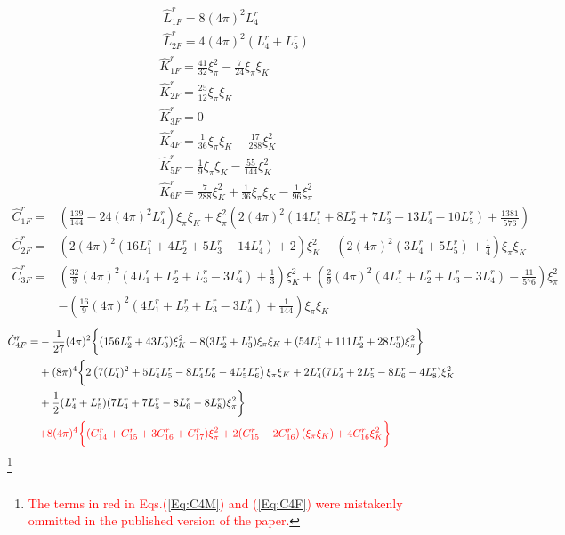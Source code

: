 \documentclass[12pt,a4paper]{article}
\begin{document}
\begin{align}
	& \hat{L}^r_{1F} = 8 (4 \pi )^2 L^r_{4} \nonumber \\
	& \hat{L}^r_{2F} = 4 (4 \pi )^2 (L^r_{4}+L^r_{5})
\end{align}
\begin{align}
	& \hat{K}^r_{1F} = \frac{41}{32} \xi _{\pi }^2 - \frac{7}{24} \xi_{\pi } \xi_K \nonumber \\
	& \hat{K}^r_{2F} = \frac{25}{12} \xi_{\pi} \xi_K \nonumber \\
	& \hat{K}^r_{3F} = 0 \nonumber \\
	& \hat{K}^r_{4F} = \frac{1}{36} \xi_{\pi} \xi_K - \frac{17}{288} \xi _K^2 \nonumber \\
	& \hat{K}^r_{5F} = \frac{1}{9} \xi_{\pi } \xi_K - \frac{55}{144} \xi _K^2 \nonumber \\
	& \hat{K}^r_{6F} = \frac{7}{288} \xi_K^2 + \frac{1}{36}\xi_{\pi} \xi_K - \frac{1}{96} \xi_{\pi }^2
\end{align}
\begin{align*}
	\hat{C}^r_{1F} =& \left(\frac{139}{144}-24 (4 \pi )^2 L^r_{4}\right) \xi _{\pi } \xi _K+\xi _{\pi }^2 \left(2 (4 \pi )^2 (14 L^r_{1}+8 L^r_{2}+7 L^r_{3}-13 L^r_{4}-10 L^r_{5})+\frac{1381}{576}\right)
\end{align*}
\begin{align*}
	\hat{C}^r_{2F} =& \left(2 (4 \pi )^2 (16 L^r_{1}+4 L^r_{2}+5 L^r_{3}-14 L^r_{4})+2\right) \xi_K^2 - \left(2 (4 \pi )^2 (3 L^r_{4}+5 L^r_{5})+\frac{1}{4}\right) \xi_{\pi} \xi_K 
\end{align*}
\begin{align*}
	\hat{C}^r_{3F} =& \left(\frac{32}{9} (4\pi)^2 (4 L^r_{1}+L^r_{2}+L^r_{3}-3 L^r_{4})+\frac{1}{3}\right) \xi_K^2 + \left(\frac{2}{9} (4\pi)^2 (4 L^r_{1}+L^r_{2}+L^r_{3}-3 L^r_{4})-\frac{11}{576} \right) \xi_{\pi}^2 \nonumber \\
	& - \left(\frac{16}{9} (4\pi)^2 (4 L^r_{1}+L^r_{2}+L^r_{3}-3 L^r_{4})+\frac{1}{144}\right) \xi_{\pi} \xi_K
\end{align*}
\begin{align} 
	\hat{C}^r_{4F} =& -\frac{1}{27} (4\pi)^2 \bigg\{ (156 L^r_{2}+43 L^r_{3}) \xi_K^2 -8 (3 L^r_{2}+L^r_{3}) \xi _{\pi } \xi _K + (54 L^r_{1}+111 L^r_{2}+28 L^r_{3}) \xi_{\pi}^2 \bigg\}  \nonumber \\
	& + (8 \pi )^4 \bigg\{ 2 \left(7 (L^r_{4})^2 + 5 L^r_{4} L^r_{5}-8 L^r_{4} L^r_{6}-4 L^r_{5} L^r_{6}\right) \xi_{\pi } \xi_K + 2 L^r_{4} (7 L^r_{4}+2 L^r_{5}-8 L^r_{6}-4 L^r_{8}) \xi_K^2 \nonumber \\
	& +\frac{1}{2} (L^r_{4}+L^r_{5}) (7 L^r_{4}+7 L^r_{5}-8 L^r_{6}-8 L^r_{8}) \xi_{\pi }^2 \bigg\} \nonumber \\
	& \textcolor{red}{ + 8 (4 \pi )^4 \bigg\{  (C^r_{14}+C^r_{15}+3 C^r_{16}+C^r_{17}) \xi_\pi^2  + 2 (C^r_{15}-2 C^r_{16}) \left(\xi _{\pi } \xi _K\right)+4 C^r_{16} \xi _K^2 \bigg\} }  
\label{Eq:C4F} 
\end{align}  \footnote{ \textcolor{red}{ The terms in red in Eqs.(\ref{Eq:C4M}) and (\ref{Eq:C4F}) were mistakenly ommitted in the published version of the paper.} }
\end{document}
